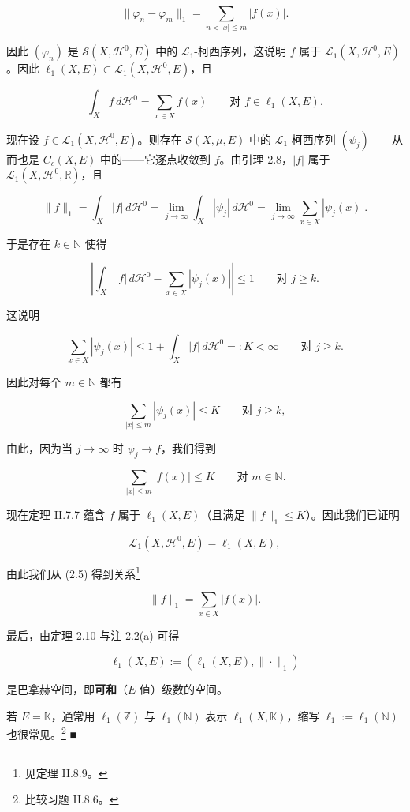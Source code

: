\begin{example}
\[
\|\varphi_n - \varphi_m\|_1 = \sum_{n < |x| \le m} |f(x)| .
\]

因此 $ (\varphi_n) $ 是 $ \mathcal{S}(X,\mathcal{H}^0,E) $ 中的 $ \mathcal{L}_1 $-柯西序列，这说明 $ f $ 属于 $ \mathcal{L}_1(X,\mathcal{H}^0,E) $。因此 $ \ell_1(X,E) \subset \mathcal{L}_1(X,\mathcal{H}^0,E) $，且

\begin{equation}
\int_X f \, d\mathcal{H}^0 = \sum_{x \in X} f(x) \qquad \text{对 } f \in \ell_1(X,E) .\tag{2.5}
\end{equation}

现在设 $ f \in \mathcal{L}_1(X,\mathcal{H}^0,E) $。则存在 $ \mathcal{S}(X,\mu,E) $ 中的 $ \mathcal{L}_1 $-柯西序列 $ (\psi_j) $——从而也是 $ C_c(X,E) $ 中的——它逐点收敛到 $ f $。由引理 2.8，$ |f| $ 属于 $ \mathcal{L}_1(X,\mathcal{H}^0,\mathbb{R}) $，且

\[
\|f\|_1 = \int_X |f| \, d\mathcal{H}^0 = \lim_{j \to \infty} \int_X |\psi_j| \, d\mathcal{H}^0 = \lim_{j \to \infty} \sum_{x \in X} |\psi_j(x)| .
\]

于是存在 $ k \in \mathbb{N} $ 使得

\[
\left| \int_X |f| \, d\mathcal{H}^0 - \sum_{x \in X} |\psi_j(x)| \right| \le 1 \qquad \text{对 } j \ge k .
\]

这说明

\[
\sum_{x \in X} |\psi_j(x)| \le 1 + \int_X |f| \, d\mathcal{H}^0 =: K < \infty \qquad \text{对 } j \ge k .
\]

因此对每个 $ m \in \mathbb{N} $ 都有

\[
\sum_{|x| \le m} |\psi_j(x)| \le K \qquad \text{对 } j \ge k ,
\]

由此，因为当 $ j \to \infty $ 时 $ \psi_j \to f $，我们得到

\[
\sum_{|x| \le m} |f(x)| \le K \qquad \text{对 } m \in \mathbb{N} .
\]

现在定理 II.7.7 蕴含 $ f $ 属于 $ \ell_1(X,E) $（且满足 $ \|f\|_1 \le K $）。因此我们已证明

\[
\mathcal{L}_1(X,\mathcal{H}^0,E) = \ell_1(X,E) ,
\]

由此我们从 (2.5) 得到关系\footnote{见定理 II.8.9。}

\[
\|f\|_1 = \sum_{x \in X} |f(x)| .
\]

最后，由定理 2.10 与注 2.2(a) 可得

\[
\ell_1(X,E) := (\ell_1(X,E), \|\cdot\|_1)
\]

是巴拿赫空间，即\textbf{可和}（$ E $ 值）级数的空间。

若 $ E = \mathbb{K} $，通常用 $ \ell_1(\mathbb{Z}) $ 与 $ \ell_1(\mathbb{N}) $ 表示 $ \ell_1(X,\mathbb{K}) $，缩写 $ \ell_1 := \ell_1(\mathbb{N}) $ 也很常见。\footnote{比较习题 II.8.6。} \nobreak\hspace{0.35em}■

\end{example}

